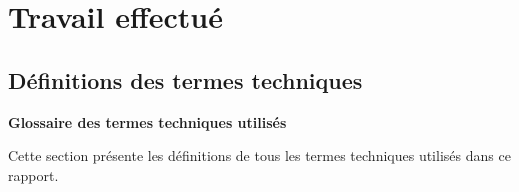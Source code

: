 \documentclass[12pt,a4paper]{report}
\let\oldchapter\chapter
\renewcommand{\chapter}{\clearpage\oldchapter}
\begin{document}
\chapter{Travail effectué}

\section{Définitions des termes techniques}

\vspace{1em}

\begin{center}
\textbf{\large Glossaire des termes techniques utilisés}
\end{center}
\vspace{1em}

Cette section présente les définitions de tous les termes techniques utilisés dans ce rapport.
\end{document}
